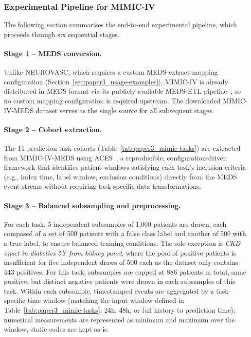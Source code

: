 \subsubsection{Experimental Pipeline for MIMIC-IV}\label{sec:paper3_exp-pipeline}
The following section summarises the end-to-end experimental pipeline, which proceeds through six sequential stages.
 
\paragraph{Stage 1 -- MEDS conversion.} Unlike NEUROVASC, which requires a custom MEDS-extract mapping configuration (Section~\ref{sec:paper3_usage-examples}), MIMIC-IV is already distributed in MEDS format via its publicly available MEDS-ETL pipeline~\cite{mcdermott_mimic-iv_2025,van_de_water_mimic-iv_2025}, so no custom mapping configuration is required upstream. The downloaded MIMIC-IV-MEDS dataset serves as the single source for all subsequent stages.
 
\paragraph{Stage 2 -- Cohort extraction.} The 11 prediction task cohorts (Table~\ref{tab:paper3_mimic-tasks}) are extracted from MIMIC-IV-MEDS using ACES~\cite{xu_aces_2025}, a reproducible, configuration-driven framework that identifies patient windows satisfying each task's inclusion criteria (e.g., index time, label window, exclusion conditions) directly from the MEDS event stream without requiring task-specific data transformations.
 
\paragraph{Stage 3 -- Balanced subsampling and preprocessing.} For each task, 5 independent subsamples of 1,000 patients are drawn, each composed of a set of 500 patients with a false  class label and another of 500 with a true label, %
to ensure balanced training conditions. The sole exception is \emph{CKD onset in diabetics 5Y from kidney panel}, where the pool of positive patients is insufficient for five independent draws of 500 each as the dataset only contains 443 positives. For this task, subsamples are capped at 886 patients in total, same positive, but distinct negative patients were drawn in each subsamples of this task. Within each subsample, timestamped events are aggregated by a task-specific time window (matching the input window defined in Table~\ref{tab:paper3_mimic-tasks}: 24h, 48h, or full history to prediction time): numerical measurements are represented as minimum and maximum over the window, static codes are kept as-is. %
 
